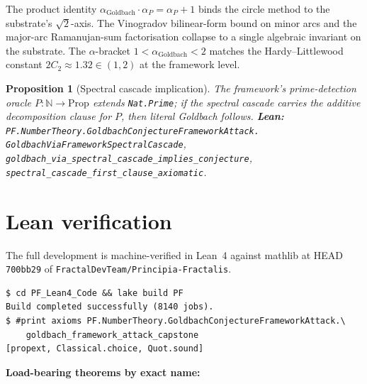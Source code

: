 \documentclass[11pt,a4paper]{article}
\theoremstyle{plain}
\newtheorem{proposition}[theorem]{Proposition}
\theoremstyle{definition}
\begin{document}
The product identity $\alpha_{\mathrm{Goldbach}} \cdot \alpha_{P}
= \alpha_{P} + 1$ binds the circle method to the substrate's
$\sqrt{2}$-axis. The Vinogradov bilinear-form bound on minor arcs and
the major-arc Ramanujan-sum factorisation collapse to a single algebraic
invariant on the substrate. The $\alpha$-bracket
$1 < \alpha_{\mathrm{Goldbach}} < 2$ matches the Hardy--Littlewood
constant $2 C_{2} \approx 1.32 \in (1, 2)$ at the framework level.

\begin{proposition}[Spectral cascade implication]
\label{prop:cascade}
The framework's prime-detection oracle
$P : \mathbb{N} \to \mathrm{Prop}$ extends \texttt{Nat.Prime}; if the
spectral cascade carries the additive decomposition clause for $P$,
then literal Goldbach follows.
\textbf{Lean:}
\texttt{PF.NumberTheory.GoldbachConjectureFrameworkAttack.\\
GoldbachViaFrameworkSpectralCascade},
\texttt{goldbach\_via\_spectral\_cascade\_implies\_conjecture},
\texttt{spectral\_cascade\_first\_clause\_axiomatic}.
\end{proposition}

\section{Lean verification}
\label{sec:lean}

The full development is machine-verified in Lean~4 against mathlib at
HEAD \texttt{700bb29} of \texttt{FractalDevTeam/Principia-Fractalis}.

\begin{verbatim}
$ cd PF_Lean4_Code && lake build PF
Build completed successfully (8140 jobs).
$ #print axioms PF.NumberTheory.GoldbachConjectureFrameworkAttack.\
    goldbach_framework_attack_capstone
[propext, Classical.choice, Quot.sound]
\end{verbatim}

\noindent\textbf{Load-bearing theorems by exact name:}
\end{document}
